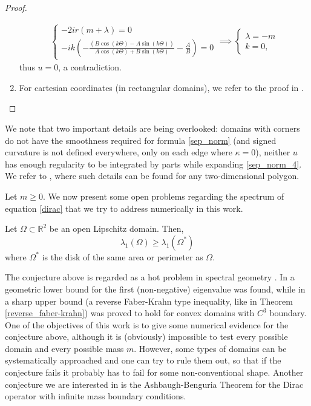 \begin{proof}
\begin{enumerate}
    \begin{align*}
        \begin{cases}
            -2 i r (m+\lambda) = 0\\
            -i k \left(-\frac{(B \cos (k\Theta  )-A \sin (k\Theta  ))}{A \cos (k\Theta  )+B \sin (k\Theta)}-\frac{A}{B}\right) = 0
        \end{cases}
        \implies
        \begin{cases}
            \lambda = -m\\
            k = 0,
        \end{cases}
    \end{align*}
    thus \(u=0\), a contradiction.
    \item For cartesian coordinates (in rectangular domains), we refer to the proof in \cite{briet2022spectral}.
    \end{enumerate}
\end{proof}

\begin{remark}
    We note that two important details are being overlooked: domains with corners do not have the smoothness required for formula \eqref{sep_norm} (and signed curvature is not defined everywhere, only on each edge where \(\kappa=0\)), neither \(u\) has enough regularity to be integrated by parts while expanding \eqref{sep_norm_4}. We refer to \cite{vu2023spectral}, where such details can be found for any two-dimensional polygon.
\end{remark}

Let \(m \geq 0\). We now present some open problems regarding the spectrum of equation \eqref{dirac} that we try to address numerically in this work.

\begin{conjecture}\label{conjecture_faber_krahn}
    Let \(\Omega \subset \mathbb{R}^2\) be an open Lipschitz domain. Then,
    \[
    \lambda_1(\Omega) \geq \lambda_1(\Omega^\ast)
    \]
    where \(\Omega^\ast\) is the disk of the same area or perimeter as \(\Omega\).
\end{conjecture}

The conjecture above is regarded as a hot problem in spectral geometry \cite{krejcirik_larson_lotoreichik_2019}. In \cite{benguria2017spectral} a geometric lower bound for the first (non-negative) eigenvalue was found, while in \cite{lotoreichik2019sharp} a sharp upper bound (a reverse Faber-Krahn type inequality, like in Theorem \ref{reverse_faber-krahn}) was proved to hold for convex domains with \(C^3\) boundary. One of the objectives of this work is to give some numerical evidence for the conjecture above, although it is (obviously) impossible to test every possible domain and every possible mass \(m\). However, some types of domains can be systematically approached and one can try to rule them out, so that if the conjecture fails it probably has to fail for some non-conventional shape. Another conjecture we are interested in is the Ashbaugh-Benguria Theorem for the Dirac operator with infinite mass boundary conditions.

